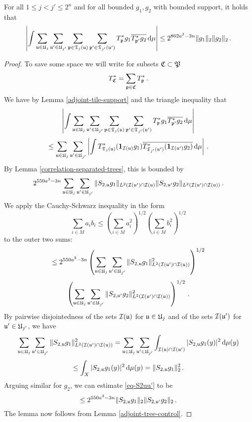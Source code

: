 {\begin{lemma}
    \label{row-correlation}
    For all $1 \le j < j' \le 2^n$ and for all bounded $g_1, g_2$ with bounded support, it holds that
    $$
        \left| \int \sum_{{\mathfrak u} \in {\mathfrak U}_j} \sum_{{\mathfrak u}' \in {\mathfrak U}_{j'}} \sum_{{\mathfrak p} \in {\mathfrak T}_j({\mathfrak u})} \sum_{{\mathfrak p}' \in {\mathfrak T}_{j'}({\mathfrak u}')} T^*_{{\mathfrak p}} g_1 \overline{T^*_{{\mathfrak p}'} g_2} \, \mathrm{d}\mu \right| \le
        2^{862a^3-3n}\|g_1\|_2 \|g_2\|_2\,.
    $$
\end{lemma}

\begin{proof}
    To save some space we will write for subsets ${\mathfrak C} \subset {\mathfrak P}$
    $$
        T_{{\mathfrak C}}^* = \sum_{{\mathfrak p} \in {\mathfrak C}} T_{{\mathfrak p}}^*\,.
    $$
    We have by Lemma \ref{adjoint-tile-support} and the triangle inequality that
    $$
        \left| \int \sum_{{\mathfrak u} \in {\mathfrak U}_j} \sum_{{\mathfrak u}' \in {\mathfrak U}_{j'}} \sum_{{\mathfrak p} \in {\mathfrak T}_j({\mathfrak u})} \sum_{{\mathfrak p}' \in {\mathfrak T}_{j'}({\mathfrak u}')} T^*_{{\mathfrak p}} g_1 \overline{T^*_{{\mathfrak p}'} g_2} \, \mathrm{d}\mu \right|
    $$
    $$
        \le   \sum_{{\mathfrak u} \in {\mathfrak U}_j} \sum_{{\mathfrak u}' \in {\mathfrak U}_{j'}} \left| \int   T^*_{{\mathfrak T}_j({\mathfrak u})} (\mathbf{1}_{{\mathcal{I}}({\mathfrak u})} g_1) \overline{T^*_{{\mathfrak T}_{j'}({\mathfrak u}')} (\mathbf{1}_{{\mathcal{I}}({\mathfrak u}')} g_2)} \, \mathrm{d}\mu \right|\,.
    $$
    By Lemma \ref{correlation-separated-trees}, this is bounded by
    \begin{equation}
        \label{eq-S2uu'}
         2^{550a^3-3n} \sum_{{\mathfrak u} \in {\mathfrak U}_j} \sum_{{\mathfrak u}' \in {\mathfrak U}_{j'}} \|S_{2,{\mathfrak u}} g_1\|_{L^2({\mathcal{I}}({\mathfrak u}')\cap {\mathcal{I}}({\mathfrak u})} \|S_{2, {\mathfrak u}'} g_2\|_{L^2({\mathcal{I}}({\mathfrak u}')\cap{\mathcal{I}}({\mathfrak u}))}\,.
    \end{equation}
    We apply the Cauchy-Schwarz inequality in the form
    \begin{equation*}
        \sum_{i \in M} a_i b_i \le (\sum_{i \in M} a_i^2 )^{1/2}(\sum_{i \in M} b_i^2 )^{1/2}
    \end{equation*} to the outer two sums:
    $$
        \le 2^{550a^3-3n} \left(\sum_{{\mathfrak u} \in {\mathfrak U}_j} \sum_{{\mathfrak u}' \in {\mathfrak U}_{j'}} \|S_{2,{\mathfrak u}} g_1\|_{L^2({\mathcal{I}}({\mathfrak u}')\cap {\mathcal{I}}({\mathfrak u}))}^2 \right)^{1/2}
    $$
    $$
        \left(\sum_{{\mathfrak u} \in {\mathfrak U}_j} \sum_{{\mathfrak u}' \in {\mathfrak U}_{j'}} \|S_{2,{\mathfrak u}'} g_2\|_{L^2({\mathcal{I}}({\mathfrak u}')\cap{\mathcal{I}}({\mathfrak u}))}^2 \right)^{1/2}\,.
    $$
    By pairwise disjointedness of the sets ${\mathcal{I}}({\mathfrak u})$ for ${\mathfrak u} \in {\mathfrak U}_j$ and of the sets ${\mathcal{I}}({\mathfrak u}')$ for ${\mathfrak u}' \in {\mathfrak U}_{j'}$, we have
    $$
        \sum_{{\mathfrak u} \in {\mathfrak U}_j}\sum_{{\mathfrak u}' \in {\mathfrak U}_{j'}} \|S_{2,{\mathfrak u}} g_1\|_{L^2({\mathcal{I}}({\mathfrak u}')\cap {\mathcal{I}}({\mathfrak u}))}^2
        = \sum_{{\mathfrak u} \in {\mathfrak U}_j}\sum_{{\mathfrak u}' \in {\mathfrak U}_{j'}} \int_{{\mathcal{I}}({\mathfrak u}) \cap {\mathcal{I}}({\mathfrak u}')} |S_{2,{\mathfrak u}} g_1(y)|^2 \, \mathrm{d}\mu(y)
    $$
    $$
        \le \int_X |S_{2,{\mathfrak u}}g_1(y)|^2 \, \mathrm{d}\mu(y) = \|S_{2,{\mathfrak u}} g_1\|_2^2\,.
    $$
    Arguing similar for $g_2$, we can estimate \eqref{eq-S2uu'} to be
    $$
        \le 2^{550a^3-3n} \|S_{2,{\mathfrak u}}g_1\|_2 \|S_{2,{\mathfrak u}'} g_2\|_2\,.
    $$
    The lemma now follows from Lemma \ref{adjoint-tree-control}.
\end{proof}

}
